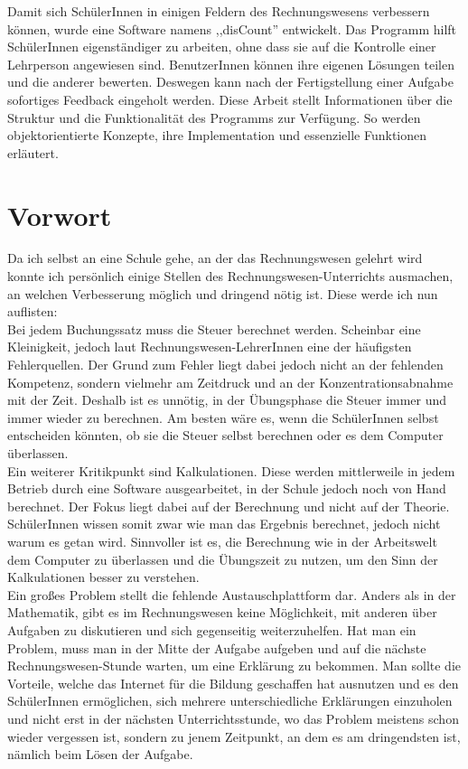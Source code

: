\documentclass[12pt]{report}
\begin{document}
\noindent Damit sich SchülerInnen in einigen Feldern des Rechnungswesens verbessern können, wurde eine Software namens ,,disCount'' entwickelt. Das Programm hilft SchülerInnen eigenständiger zu arbeiten, ohne dass sie auf die Kontrolle einer Lehrperson angewiesen sind. BenutzerInnen können ihre eigenen Lösungen teilen und die anderer bewerten. Deswegen kann nach der Fertigstellung einer Aufgabe sofortiges Feedback eingeholt werden. Diese Arbeit stellt Informationen über die Struktur und die Funktionalität des Programms zur Verfügung. So werden objektorientierte Konzepte, ihre Implementation und essenzielle Funktionen erläutert.

\newpage
  
\section*{Vorwort} 
  
Da ich selbst an eine Schule gehe, an der das Rechnungswesen gelehrt wird konnte ich persönlich einige Stellen des Rechnungswesen-Unterrichts ausmachen, an welchen Verbesserung möglich und dringend nötig ist. Diese werde ich nun auflisten:\\

\noindent Bei jedem Buchungssatz muss die Steuer berechnet werden. Scheinbar eine Kleinigkeit, jedoch laut Rechnungswesen-LehrerInnen eine der häufigsten Fehlerquellen. Der Grund zum Fehler liegt dabei jedoch nicht an der fehlenden Kompetenz, sondern vielmehr am Zeitdruck und an der Konzentrationsabnahme mit der Zeit. Deshalb ist es unnötig, in der Übungsphase die Steuer immer und immer wieder zu berechnen. Am besten wäre es, wenn die SchülerInnen selbst entscheiden könnten, ob sie die Steuer selbst berechnen oder es dem Computer überlassen.\\

\noindent Ein weiterer Kritikpunkt sind Kalkulationen. Diese werden mittlerweile in jedem Betrieb durch eine Software ausgearbeitet, in der Schule jedoch noch von Hand berechnet. Der Fokus liegt dabei auf der Berechnung und nicht auf der Theorie. SchülerInnen wissen somit zwar wie man das Ergebnis berechnet, jedoch nicht warum es getan wird. Sinnvoller ist es, die Berechnung wie in der Arbeitswelt dem Computer zu überlassen und die Übungszeit zu nutzen, um den Sinn der Kalkulationen besser zu verstehen.\\

\noindent Ein großes Problem stellt die fehlende Austauschplattform dar. Anders als in der Mathematik, gibt es im Rechnungswesen keine Möglichkeit, mit anderen über Aufgaben zu diskutieren und sich gegenseitig weiterzuhelfen. Hat man ein Problem, muss man in der Mitte der Aufgabe aufgeben und auf die nächste Rechnungswesen-Stunde warten, um eine Erklärung zu bekommen. Man sollte die Vorteile, welche das Internet für die Bildung geschaffen hat ausnutzen und es den SchülerInnen ermöglichen, sich mehrere unterschiedliche Erklärungen einzuholen und nicht erst in der nächsten Unterrichtsstunde, wo das Problem meistens schon wieder vergessen ist, sondern zu jenem Zeitpunkt, an dem es am dringendsten ist, nämlich beim Lösen der Aufgabe.\\
\end{document}
